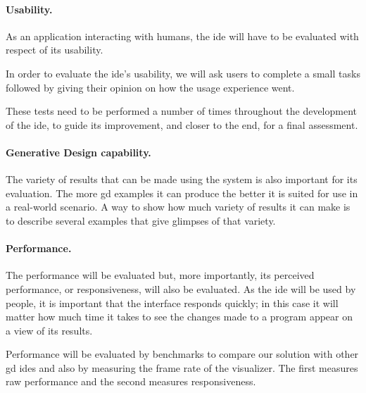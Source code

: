 \documentclass{./llncs2e/llncs}
\begin{document}
	\paragraph{Usability.}
	
	As an application interacting with humans, the \ac{ide} will have to be evaluated with respect of its usability.
	
	In order to evaluate the \ac{ide}'s usability, we will ask users to complete a small tasks followed by giving their opinion on how the usage experience went.
	
	These tests need to be performed a number of times throughout the development of the \ac{ide}, to guide its improvement, and closer to the end, for a final assessment.
	
	
	\paragraph{Generative Design capability.}
	The variety of results that can be made using the system is also important for its evaluation.
	The more \ac{gd} examples it can produce the better it is suited for use in a real-world scenario.
	A way to show how much variety of results it can make is to describe several examples that give glimpses of that variety.
	
	\paragraph{Performance.}
	
	The performance will be evaluated but, more importantly, its perceived performance, or responsiveness, will also be evaluated.
	As the \ac{ide} will be used by people, it is important that the interface responds quickly;
	in this case it will matter how much time it takes to see the changes made to a program appear on a view of its results.
	
	Performance will be evaluated by benchmarks to compare our solution with other \ac{gd} \ac{ide}s and also by measuring the frame rate of the visualizer.
	The first measures raw performance and the second measures responsiveness.
	
\end{document}

